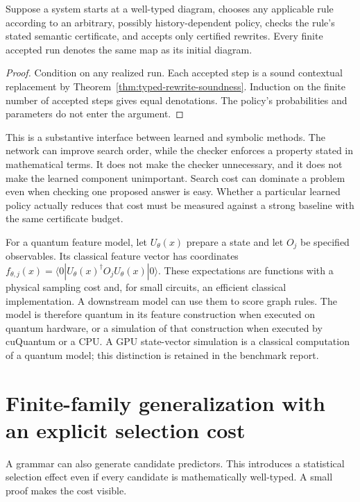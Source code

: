 \begin{proposition}
Suppose a system starts at a well-typed diagram, chooses any applicable rule according to an arbitrary, possibly history-dependent policy, checks the rule's stated semantic certificate, and accepts only certified rewrites. Every finite accepted run denotes the same map as its initial diagram.
\end{proposition}
\begin{proof}
Condition on any realized run. Each accepted step is a sound contextual replacement by Theorem~\ref{thm:typed-rewrite-soundness}. Induction on the finite number of accepted steps gives equal denotations. The policy's probabilities and parameters do not enter the argument.
\end{proof}

This is a substantive interface between learned and symbolic methods. The network can improve search order, while the checker enforces a property stated in mathematical terms. It does not make the checker unnecessary, and it does not make the learned component unimportant. Search cost can dominate a problem even when checking one proposed answer is easy. Whether a particular learned policy actually reduces that cost must be measured against a strong baseline with the same certificate budget.

For a quantum feature model, let $U_\theta(x)$ prepare a state and let $O_j$ be specified observables. Its classical feature vector has coordinates
$f_{\theta,j}(x)=\langle0|U_\theta(x)^\dagger O_jU_\theta(x)|0\rangle$.
These expectations are functions with a physical sampling cost and, for small circuits, an efficient classical implementation. A downstream model can use them to score graph rules. The model is therefore quantum in its feature construction when executed on quantum hardware, or a simulation of that construction when executed by cuQuantum or a CPU. A GPU state-vector simulation is a classical computation of a quantum model; this distinction is retained in the benchmark report.

\section{Finite-family generalization with an explicit selection cost}

A grammar can also generate candidate predictors. This introduces a statistical selection effect even if every candidate is mathematically well-typed. A small proof makes the cost visible.

